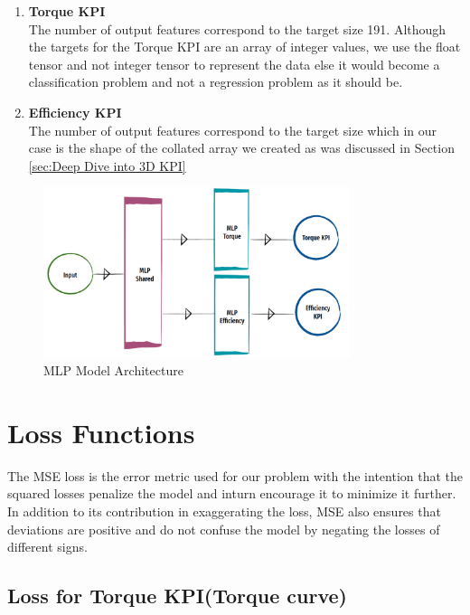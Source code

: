 \documentclass{report} %
\begin{document}
\begin{enumerate}
    \item \textbf{Torque \ac{KPI}} \\
    The number of output features correspond to the target size 191.
    Although the targets for the Torque \ac{KPI} are an array of integer values, we use the float tensor and not integer tensor to represent the data else it would become a classification problem and not a regression problem as it should be. 
    \item \textbf{Efficiency \ac{KPI}} \\
    The number of output features correspond to the target size which in our case is the shape of the collated array we created as was discussed in Section \ref{sec:Deep Dive into 3D KPI}
\end{enumerate}

\begin{figure}[H]
    \centering
    \includegraphics[width=0.8\textwidth]{./ReportImages/mlp_architecture.png} 
    \caption{MLP Model Architecture}
    \label{fig:MLP Model Architecture}
\end{figure}

\section{Loss Functions}\label{sec:Loss Functions}
The \ac{MSE} loss is the error metric used for our problem with the intention that the squared losses penalize the model and inturn encourage it to minimize it further.
In addition to its contribution in exaggerating the loss, \ac{MSE} also ensures that deviations are positive and do not confuse the model by negating the losses of different signs. \\

\subsection{Loss for Torque \ac{KPI}(Torque curve)}\label{sec:Loss for 2D KPI}
\end{document}
